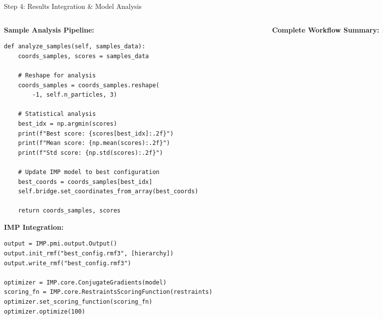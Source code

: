 \documentclass[aspectratio=169]{beamer}
\begin{document}
\begin{frame}[fragile]{Step 4: Results Integration \& Model Analysis}
\begin{columns}[T]
\begin{column}{0.5\textwidth}
\textbf{Sample Analysis Pipeline:}
\begin{lstlisting}
def analyze_samples(self, samples_data):
    coords_samples, scores = samples_data
    
    # Reshape for analysis
    coords_samples = coords_samples.reshape(
        -1, self.n_particles, 3)
    
    # Statistical analysis
    best_idx = np.argmin(scores)
    print(f"Best score: {scores[best_idx]:.2f}")
    print(f"Mean score: {np.mean(scores):.2f}")
    print(f"Std score: {np.std(scores):.2f}")
    
    # Update IMP model to best configuration
    best_coords = coords_samples[best_idx]
    self.bridge.set_coordinates_from_array(best_coords)
    
    return coords_samples, scores
\end{lstlisting}

\textbf{IMP Integration:}
\begin{lstlisting}
output = IMP.pmi.output.Output()
output.init_rmf("best_config.rmf3", [hierarchy])
output.write_rmf("best_config.rmf3")

optimizer = IMP.core.ConjugateGradients(model)
scoring_fn = IMP.core.RestraintsScoringFunction(restraints)
optimizer.set_scoring_function(scoring_fn)
optimizer.optimize(100)
\end{lstlisting}
\end{column}

\begin{column}{0.5\textwidth}
\textbf{Complete Workflow Summary:}

\end{column}
\end{columns}
\end{frame}
\end{document}
